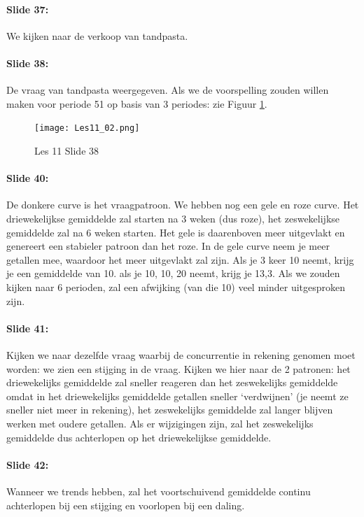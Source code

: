 \documentclass[10pt,a4paper]{report}
\begin{document}
\paragraph{Slide 37:} We kijken naar de verkoop van tandpasta. 

\paragraph{Slide 38:} De vraag van tandpasta weergegeven. Als we de voorspelling zouden willen maken voor periode 51 op basis van 3 periodes: zie Figuur \ref{les11_02}.

\begin{figure}[h!]
\centering
\texttt{[image: Les11\_02.png]}
\caption{Les 11 Slide 38} 
\label{les11_02}
\end{figure}

\paragraph{Slide 40:} De donkere curve is het vraagpatroon. We hebben nog een gele en roze curve. Het driewekelijkse gemiddelde zal starten na 3 weken (dus roze), het zeswekelijkse gemiddelde zal na 6 weken starten. Het gele is daarenboven meer uitgevlakt en genereert een stabieler patroon dan het roze. In de gele curve neem je meer getallen mee, waardoor het meer uitgevlakt zal zijn. Als je 3 keer 10 neemt, krijg je een gemiddelde van 10. als je 10, 10, 20 neemt, krijg je 13,3. Als we zouden kijken naar 6 perioden, zal een afwijking (van die 10) veel minder uitgesproken zijn. 

\paragraph{Slide 41:} Kijken we naar dezelfde vraag waarbij de concurrentie in rekening genomen moet worden: we zien een stijging in de vraag. Kijken we hier naar de 2 patronen: het driewekelijks gemiddelde zal sneller reageren dan het zeswekelijks gemiddelde omdat in het driewekelijks gemiddelde getallen sneller `verdwijnen' (je neemt ze sneller niet meer in rekening), het zeswekelijks gemiddelde zal langer blijven werken met oudere getallen. Als er wijzigingen zijn, zal het zeswekelijks gemiddelde dus achterlopen op het driewekelijkse gemiddelde.

\paragraph{Slide 42:} Wanneer we trends hebben, zal het voortschuivend gemiddelde continu achterlopen bij een stijging en voorlopen bij een daling.
\end{document}
